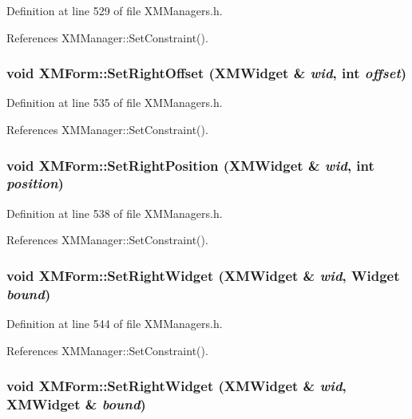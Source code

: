 Definition at line 529 of file XMManagers.h.

References XMManager::Set\-Constraint().
\subsubsection{\setlength{\rightskip}{0pt plus 5cm}void XMForm::Set\-Right\-Offset ({\bf XMWidget} \& {\em wid}, int {\em offset})\hspace{0.3cm}{\tt  [inline]}}\label{classXMForm_a23}




Definition at line 535 of file XMManagers.h.

References XMManager::Set\-Constraint().
\subsubsection{\setlength{\rightskip}{0pt plus 5cm}void XMForm::Set\-Right\-Position ({\bf XMWidget} \& {\em wid}, int {\em position})\hspace{0.3cm}{\tt  [inline]}}\label{classXMForm_a24}




Definition at line 538 of file XMManagers.h.

References XMManager::Set\-Constraint().
\subsubsection{\setlength{\rightskip}{0pt plus 5cm}void XMForm::Set\-Right\-Widget ({\bf XMWidget} \& {\em wid}, Widget {\em bound})\hspace{0.3cm}{\tt  [inline]}}\label{classXMForm_a26}




Definition at line 544 of file XMManagers.h.

References XMManager::Set\-Constraint().
\subsubsection{\setlength{\rightskip}{0pt plus 5cm}void XMForm::Set\-Right\-Widget ({\bf XMWidget} \& {\em wid}, {\bf XMWidget} \& {\em bound})\hspace{0.3cm}{\tt  [inline]}}\label{classXMForm_a25}




